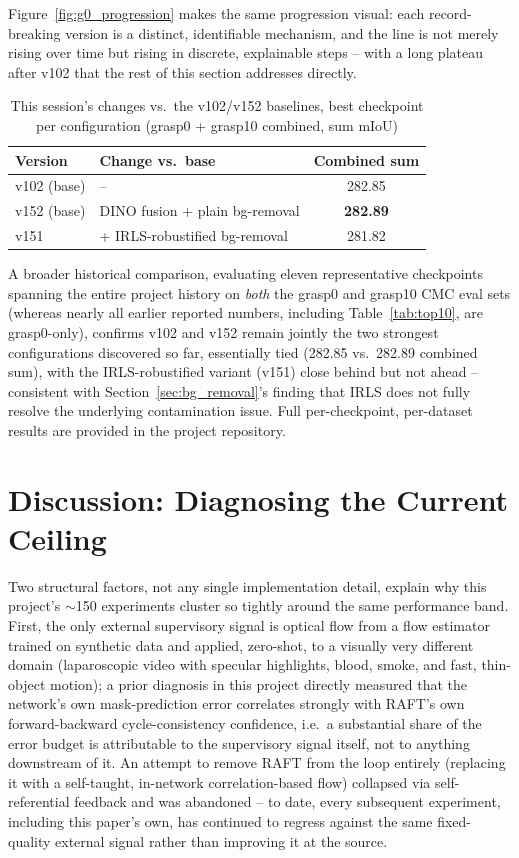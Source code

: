 \documentclass[conference]{IEEEtran}
\begin{document}
Figure~\ref{fig:g0_progression} makes the same progression visual: each
record-breaking version is a distinct, identifiable mechanism, and the
line is not merely rising over time but rising in discrete, explainable
steps -- with a long plateau after v102 that the rest of this section
addresses directly.

\begin{table}[htbp]
\caption{This session's changes vs.\ the v102/v152 baselines, best checkpoint per configuration (grasp0 + grasp10 combined, sum mIoU)}
\label{tab:this_session}
\centering
\begin{tabular}{llc}
\toprule
Version & Change vs.\ base & Combined sum \\
\midrule
v102 (base) & -- & 282.85 \\
v152 (base) & DINO fusion + plain bg-removal & \textbf{282.89} \\
v151 & \quad + IRLS-robustified bg-removal & 281.82 \\
\bottomrule
\end{tabular}
\end{table}

A broader historical comparison, evaluating eleven representative
checkpoints spanning the entire project history on \emph{both} the
grasp0 and grasp10 CMC eval sets (whereas nearly all earlier reported
numbers, including Table~\ref{tab:top10}, are grasp0-only), confirms
v102 and v152 remain jointly the two strongest configurations discovered
so far, essentially tied (282.85 vs.\ 282.89 combined sum), with the
IRLS-robustified variant (v151) close behind but not ahead -- consistent
with Section~\ref{sec:bg_removal}'s finding that IRLS does not fully
resolve the underlying contamination issue. Full per-checkpoint,
per-dataset results are provided in the project repository.

\section{Discussion: Diagnosing the Current Ceiling}
\label{sec:discussion}

Two structural factors, not any single implementation detail, explain why
this project's $\sim$150 experiments cluster so tightly around the same
performance band. First, the only external supervisory signal is optical
flow from a flow estimator trained on synthetic data and applied,
zero-shot, to a visually very different domain (laparoscopic video with
specular highlights, blood, smoke, and fast, thin-object motion); a prior
diagnosis in this project directly measured that the network's own
mask-prediction error correlates strongly with RAFT's own forward-backward
cycle-consistency confidence, i.e.\ a substantial share of the error
budget is attributable to the supervisory signal itself, not to anything
downstream of it. An attempt to remove RAFT from the loop entirely
(replacing it with a self-taught, in-network correlation-based flow)
collapsed via self-referential feedback and was abandoned -- to date,
every subsequent experiment, including this paper's own, has continued to
regress against the same fixed-quality external signal rather than
improving it at the source.
\end{document}
